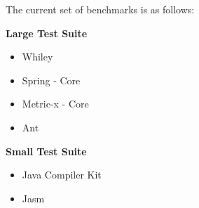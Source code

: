 The current set of benchmarks is as follows:

\textbf{Large Test Suite}
\begin{itemize}
\item Whiley
\item Spring - Core
\item Metric-x - Core
\item Ant
\end{itemize}
\textbf{Small Test Suite}
\begin{itemize}
\item Java Compiler Kit
\item Jasm
\end{itemize}
